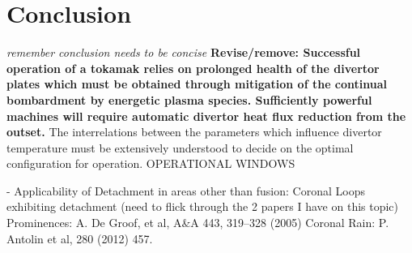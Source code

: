 \documentclass[12pt]{article}  %
\begin{document}
\section{Conclusion}\label{secConclusion}
\textit{remember conclusion needs to be concise}
\textbf{Revise/remove: Successful operation of a tokamak relies on prolonged health of the divertor plates which must be obtained through mitigation of the continual bombardment by energetic plasma species. Sufficiently powerful machines will require automatic divertor heat flux reduction from the outset.} The interrelations between the parameters which influence divertor temperature must be extensively understood to decide on the optimal configuration for operation. OPERATIONAL WINDOWS


- Applicability of Detachment in areas other than fusion: Coronal Loops exhibiting detachment (need to flick through the 2 papers I have on this topic) 
Prominences: A. De Groof, et al, A\&A 443, 319–328 (2005)
Coronal Rain: P. Antolin et al, 280 (2012) 457.














\printbibliography
\end{document}
